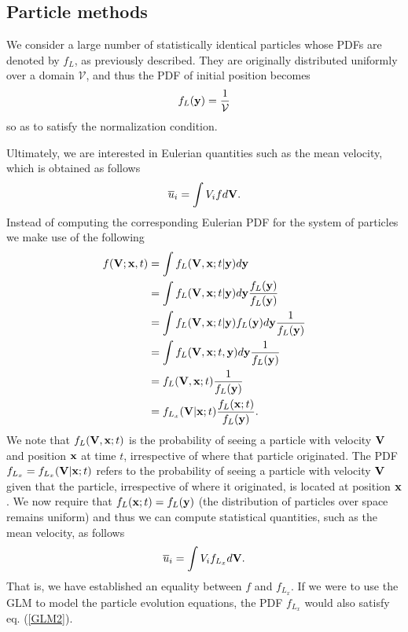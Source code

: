 \documentclass[oneside,a4paper,11pt]{report}
\newcommand{\uavg}{\overline{u}}
\begin{document}
\subsection{Particle methods}
We consider a large number of statistically identical particles whose PDFs are denoted by  $f_L$, as previously described. They are originally distributed uniformly over a domain $\mathcal{V}$, and thus the PDF of initial position becomes
\begin{equation}
f_L(\mathbf{y}) = \frac{1}{\mathcal{V}}
\end{equation}
so as to satisfy the normalization condition.

Ultimately, we are interested in Eulerian quantities such as the mean velocity, which is obtained as follows
\begin{equation}
\uavg_i = \int V_i f d\Vvec.
\end{equation}
Instead of computing the corresponding Eulerian PDF for the system of particles we make use of the following
\begin{align}
f(\mathbf{V}; \mathbf{x},t) &= \int f_L(\mathbf{V}, \mathbf{x}; t|\mathbf{y}) d\mathbf{y} \nonumber \\
& = \int f_L(\mathbf{V}, \mathbf{x}; t|\mathbf{y}) d\mathbf{y} \frac{f_L(\mathbf{y})}{f_L(\mathbf{y})} \nonumber \\
& = \int f_L(\mathbf{V}, \mathbf{x}; t| \mathbf{y}) f_L(\mathbf{y}) d\mathbf{y} \frac{1}{f_L(\mathbf{y})} \nonumber \\
& = \int f_L(\mathbf{V}, \mathbf{x}; t, \mathbf{y}) d\mathbf{y} \frac{1}{f_L(\mathbf{y})} \nonumber \\
& = f_L(\mathbf{V}, \mathbf{x}; t) \frac{1}{f_L(\mathbf{y})} \nonumber \\
& = f_{L_x}(\mathbf{V}| \mathbf{x}; t) \frac{f_L(\mathbf{x}; t)}{f_L(\mathbf{y})}.
\end{align}
We note that $f_L(\mathbf{V},\mathbf{x};t)$ is the probability of seeing a particle with velocity $\mathbf{V}$ and position $\mathbf{x}$ at time $t$, irrespective of where that particle originated. The PDF $f_{L_x} = f_{L_x}(\mathbf{V}|\mathbf{x};t)$ refers to the probability of seeing a particle with velocity $\mathbf{V}$ given that the particle, irrespective of where it originated, is located at position $\mathbf{x}$. We now require that $f_L(\mathbf{x};t) = f_L(\mathbf{y})$ (the distribution of particles over space remains uniform) and thus we can compute statistical quantities, such as the mean velocity, as follows
\begin{equation}
\uavg_i = \int V_i f_{L_x} d\Vvec.
\end{equation}
That is, we have established an equality between $f$ and $f_{L_x}$. If we were to use the GLM to model the particle evolution equations, the PDF $f_{L_x}$ would also satisfy eq. (\ref{GLM2}).
\end{document}
